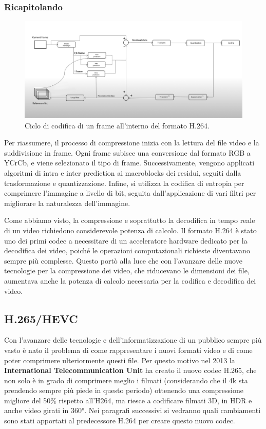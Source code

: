 \documentclass[a4paper,12pt, oneside]{article}
\begin{document}
\subsubsection{Ricapitolando}
\begin{figure}[h]
    \centering
    \includegraphics[width=1\textwidth]{images/h264-coding-loop.png}
    \caption{Ciclo di codifica di un frame all'interno del formato H.264.}
    \label{fig:h264_coding_loop}
\end{figure}

\noindent Per riassumere, il processo di compressione inizia con la lettura del file video e la
suddivisione in frame. Ogni frame subisce una conversione dal formato RGB a YCrCb, e viene
selezionato il tipo di frame. Successivamente, vengono applicati algoritmi di intra e inter prediction
ai macroblocks dei residui, seguiti dalla trasformazione e quantizzazione. Infine, si utilizza la
codifica di entropia per comprimere l'immagine a livello di bit, seguita dall'applicazione di vari
filtri per migliorare la naturalezza dell'immagine.

Come abbiamo visto, la compressione e soprattutto la decodifica in tempo reale di un video richiedono
considerevole potenza di calcolo. Il formato H.264 è stato uno dei primi codec a necessitare di un
acceleratore hardware dedicato per la decodifica dei video, poiché le operazioni computazionali richieste
diventavano sempre più complesse. Questo portò alla luce che con l'avanzare delle nuove tecnologie per
la compressione dei video, che riducevano le dimensioni dei file, aumentava anche la potenza di calcolo
necessaria per la codifica e decodifica dei video.

\subsection{H.265/HEVC}
Con l'avanzare delle tecnologie e dell'informatizzazione di un pubblico sempre più vasto
è nato il problema di come rappresentare i nuovi formati video e di come poter comprimere ulteriormente
questi file. Per questo motivo nel 2013 la \textbf{International Telecommunication Unit} ha creato il
nuovo codec H.265, che non solo è in grado di comprimere meglio i filmati (considerando che il 4k sta
prendendo sempre più piede in questo periodo) ottenendo una compressione migliore del 50\% rispetto all'H264, ma
riesce a codificare filmati 3D, in HDR e anche video girati in 360°. Nei paragrafi successivi si vedranno quali
cambiamenti sono stati apportati al predecessore H.264 per creare questo nuovo codec.
\end{document}
